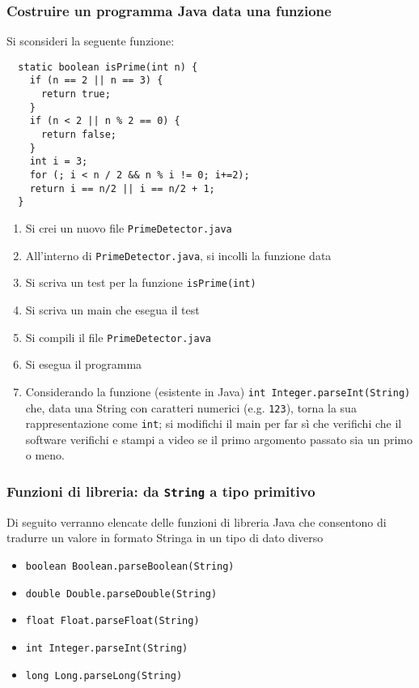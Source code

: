\documentclass{beamer}
\begin{document}
\begin{frame}[fragile]
\frametitle{Costruire un programma Java data una funzione}
Si sconsideri la seguente funzione:
\scriptsize{}
\begin{verbatim}
  static boolean isPrime(int n) {
    if (n == 2 || n == 3) {
      return true;
    }
    if (n < 2 || n % 2 == 0) {
      return false;
    }
    int i = 3;
    for (; i < n / 2 && n % i != 0; i+=2);
    return i == n/2 || i == n/2 + 1;
  }\end{verbatim}
\begin{enumerate}
 \item Si crei un nuovo file \texttt{PrimeDetector.java}
 \item All'interno di \texttt{PrimeDetector.java}, si incolli la funzione data
 \item Si scriva un test per la funzione \texttt{isPrime(int)}
 \item Si scriva un main che esegua il test
 \item Si compili il file \texttt{PrimeDetector.java}
 \item Si esegua il programma
 \item Considerando la funzione (esistente in Java) \texttt{int Integer.parseInt(String)} che, data una String con caratteri numerici (e.g. \texttt{\textquotedbl{}123\textquotedbl{}}), torna la sua rappresentazione come \texttt{int}; si modifichi il main per far sì che verifichi che il software verifichi e stampi a video se il primo argomento passato sia un primo o meno.
\end{enumerate}
\end{frame}

\begin{frame}[fragile]
\frametitle{Funzioni di libreria: da \texttt{String} a tipo primitivo}
Di seguito verranno elencate delle funzioni di libreria Java che consentono di tradurre un valore in formato Stringa in un tipo di dato diverso
\begin{itemize}
 \item \texttt{boolean Boolean.parseBoolean(String)}
 \item \texttt{double Double.parseDouble(String)}
 \item \texttt{float Float.parseFloat(String)}
 \item \texttt{int Integer.parseInt(String)}
 \item \texttt{long Long.parseLong(String)}
\end{itemize}

\end{frame}
\end{document}
